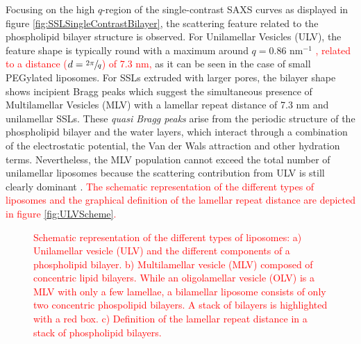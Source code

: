 

Focusing on the high $q$-region of the single-contrast SAXS curves as displayed in figure \ref{fig:SSLSingleContrastBilayer}, the scattering feature related to the phospholipid bilayer structure is observed. For Unilamellar Vesicles (ULV), the feature shape is typically round with a maximum around $q=0.86$ nm$^{-1}$ \citep{varga_characterization_2012}\textcolor{red}{, related to a distance ($d=\sfrac{2\pi}{q}$) of 7.3 nm,} as it can be seen in the case of small PEGylated liposomes. For SSLs extruded with larger pores, the bilayer shape shows incipient Bragg peaks which suggest the simultaneous presence of Multilamellar Vesicles (MLV) with a lamellar repeat distance of 7.3 nm and unilamellar SSLs. These \emph{quasi Bragg peaks} arise from the periodic structure of the phospholipid bilayer and the water layers, which interact through a combination of the electrostatic potential, the Van der Wals attraction and other hydration terms. Nevertheless, the MLV population cannot exceed the total number of unilamellar liposomes because the scattering contribution from ULV is still clearly dominant \citep{sakuragi_transformation_2011}. \textcolor{red}{The schematic representation of the different types of liposomes and the graphical definition of the lamellar repeat distance are depicted in figure \ref{fig:ULVScheme}.}

\begin{figure}
	\centering
		\caption[Scheme of ULV and MLVs.]{\textcolor{red}{Schematic representation of the different types of liposomes: a) Unilamellar vesicle (ULV) and the different components of a phospholipid bilayer. b) Multilamellar vesicle (MLV) composed of concentric lipid bilayers. While an oligolamellar vesicle (OLV) is a MLV with only a few lamellae, a bilamellar liposome consists of only two concentric phospolipid bilayers. A stack of bilayers is highlighted with a red box. c) Definition of the lamellar repeat distance in a stack of phospholipid bilayers.}}
\end{figure}

